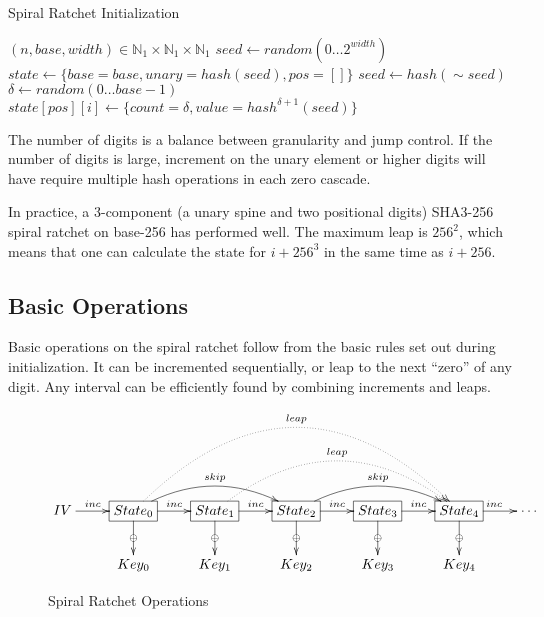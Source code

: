 \documentclass{article}
\begin{document}
	\begin{algorithm}
		\caption{Spiral Ratchet Initialization}
		\label{alg:setup}

		\begin{algorithmic}[1]
			\Require $(n, base, width) \in \mathbb{N}_{1}\times{\mathbb{N}_{1}\times{\mathbb{N}_{1}}}$
			\State $seed \gets random(0\ldots{2^{width}})$
			\State $state \gets \lbrace base = base, unary = hash(seed), pos = [] \rbrace$
			 
				\State $seed \gets hash(\sim{seed})$ 
				\State $\delta \gets random(0\ldots{base - 1})$
				\State $state[pos][i] \gets \{count = \delta, value = hash^{\delta + 1}(seed)\rbrace$
			\EndFor
			\\
		\end{algorithmic}
	\end{algorithm}

	The number of digits is a balance between granularity and jump control. If the number of digits is large, increment on the unary element or higher digits will have require multiple hash operations in each zero cascade.
	
	In practice, a 3-component (a unary spine and two positional digits) SHA3-256 spiral ratchet on base-256 has performed well. The maximum leap is $256^{2}$, which means that one can calculate the state for $i + 256^{3}$ in the same time as $i + 256$.

	\subsection{Basic Operations}
	
	Basic operations on the spiral ratchet follow from the basic rules set out during initialization. It can be incremented sequentially, or leap to the next ``zero'' of any digit. Any interval can be efficiently found by combining increments and leaps.
	
	\begin{figure}[h]
		\centering
		
		$\xymatrix{
			IV \ar[r]^<<<<<{inc} 
				& *+[F]{State_{0}}
					\ar[d]|\oplus
					\ar[r]^{inc}
					\ar@/^1.5pc/[rr]^{skip}
					\ar@{.>}@/^5pc/[rrrr]^{leap}
				& *+[F]{State_{1}}
					\ar[d]|\oplus
					\ar[r]^{inc}
					\ar@{.>}@/^3pc/[rrr]^{leap}
				& *+[F]{State_{2}} 
					\ar[d]|\oplus
					\ar[r]^{inc}
					\ar@/^1.5pc/[rr]^{skip}
				& *+[F]{State_{3}}
					\ar[d]|\oplus
					\ar[r]^{inc}
				& *+[F]{State_{4}}
					\ar[d]|\oplus
					\ar[r]^{inc}
				& \cdots
			\\
				& Key_{0}
				& Key_{1}
				& Key_{2}
				& Key_{3}
				& Key_{4}
		}$
		
		\caption{Spiral Ratchet Operations}
	\end{figure}
\end{document}
